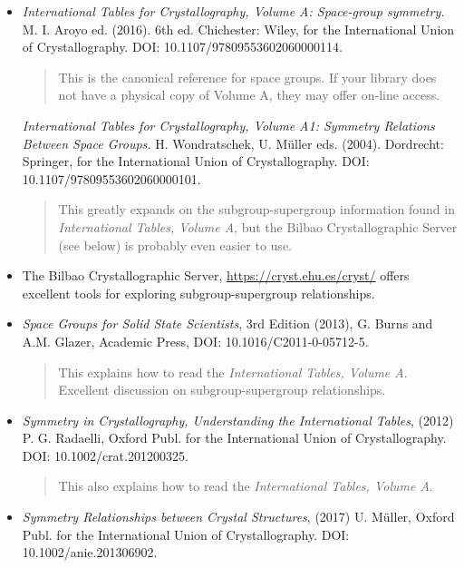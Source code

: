 \begin{itemize}
\item 
\textit{International Tables for Crystallography, Volume A: Space-group symmetry.} M. I. Aroyo ed. (2016). 6th ed. Chichester: Wiley, for the International Union of Crystallography. DOI:  10.1107/97809553602060000114. 
\begin{quote}
This is the canonical reference for space groups. If your library does not have a physical copy of Volume A, they may offer on-line access.
\end{quote}

\textit{International Tables for Crystallography, Volume A1: Symmetry Relations Between Space Groups.} H. Wondratschek, U. Müller eds. (2004). Dordrecht: Springer, for the International Union of Crystallography. DOI:  10.1107/97809553602060000101.
\begin{quote}
This greatly expands on the subgroup-supergroup information found in \textit{International Tables, Volume A}, but the Bilbao Crystallographic Server (see below) is probably even easier to use. 
\end{quote}

\item
The Bilbao Crystallographic Server, \url{https://cryst.ehu.es/cryst/} offers excellent tools for exploring subgroup-supergroup relationships. 

\item \textit{Space Groups for Solid State Scientists}, 3rd Edition (2013), G. Burns and A.M. Glazer, Academic Press, DOI: 10.1016/C2011-0-05712-5. 
\begin{quote}
This explains how to read the \textit{International Tables, Volume A}. Excellent discussion on subgroup-supergroup relationships. 
\end{quote}

\item
\textit{Symmetry in Crystallography, Understanding the International Tables}, (2012) P. G. Radaelli, Oxford Publ. for the International Union of Crystallography. DOI: 10.1002/crat.201200325.
\begin{quote}
This also explains how to read the \textit{International Tables, Volume A}. 
\end{quote}

\item
\textit{Symmetry Relationships between Crystal Structures}, (2017) U. Müller, Oxford Publ. for the International Union of Crystallography. DOI: 10.1002/anie.201306902.
\end{itemize}
